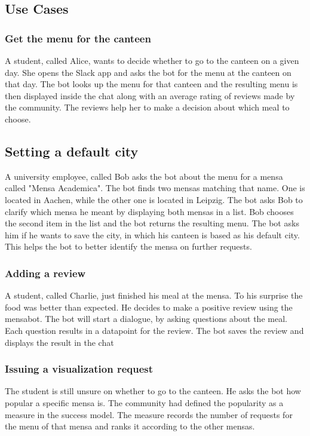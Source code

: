 \subsection{Use Cases}

\subsubsection{Get the menu for the canteen} A student, called Alice, wants to decide whether to go to the canteen on a given day. She opens the Slack app and asks the bot for the menu at the canteen on that day. The bot looks up the menu for that canteen and the resulting menu is then displayed inside the chat along with an average rating of reviews made by the community. The reviews help her to make a decision about which meal to choose.

\subsection{Setting a default city}
A university employee, called Bob asks the bot about the menu for a mensa called "Mensa Academica". The bot finds two mensas matching that name. One is located in Aachen, while the other one is located in Leipzig. 
The bot asks Bob to clarify which mensa he meant by displaying both mensas in a list. Bob chooses the second item in the list and the bot returns the resulting menu.
The bot asks him if he wants to save the city, in which his canteen is based as his default city. This helps the bot to better identify the mensa on further requests.

\subsubsection{Adding a review} A student, called Charlie, just finished his meal at the mensa. To his surprise the food was better than expected. He decides to make a positive review using the mensabot. 
The bot will start a dialogue, by asking questions about the meal. Each question results in a datapoint for the review. The bot saves the review and displays the result in the chat



\subsubsection{Issuing a visualization request}
The student is still unsure on whether to go to the canteen. He asks the bot how popular a specific mensa is. The community had defined the popularity as a measure in the success model. The measure records the number of requests for the menu of that mensa and ranks it according to the other mensas.

